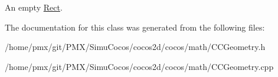 An empty \hyperlink{classRect}{Rect}. 

The documentation for this class was generated from the following files\+:\begin{DoxyCompactItemize}
\item 
/home/pmx/git/\+P\+M\+X/\+Simu\+Cocos/cocos2d/cocos/math/C\+C\+Geometry.\+h\item 
/home/pmx/git/\+P\+M\+X/\+Simu\+Cocos/cocos2d/cocos/math/C\+C\+Geometry.\+cpp\end{DoxyCompactItemize}
